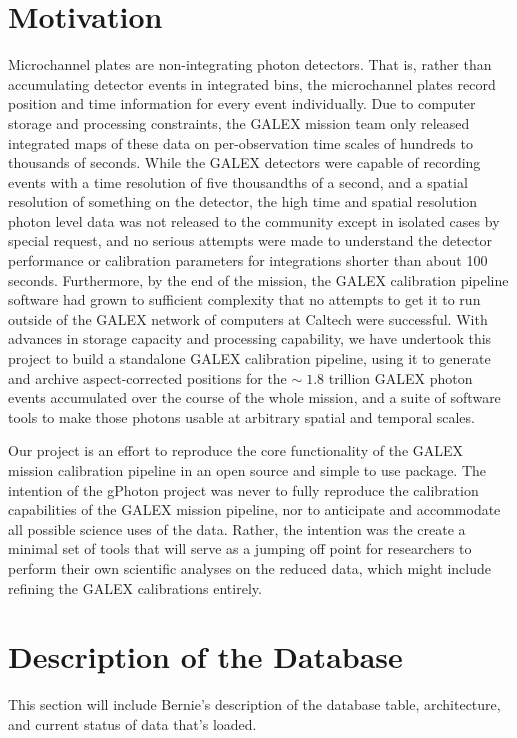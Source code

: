 \documentclass[preprint]{aastex}
\begin{document}
\section{Motivation}
\label{motivation}
Microchannel plates are non-integrating photon detectors. That is, rather than accumulating detector events in integrated bins, the microchannel plates record position and time information for every event individually. Due to computer storage and processing constraints, the GALEX mission team only released integrated maps of these data on per-observation time scales of hundreds to thousands of seconds. While the GALEX detectors were capable of recording events with a time resolution of five thousandths of a second, and a spatial resolution of {\color{red}something} on the detector, the high time and spatial resolution photon level data was not released to the community except in isolated cases by special request, and no serious attempts were made to understand the detector performance or calibration parameters for integrations shorter than about 100 seconds. Furthermore, by the end of the mission, the GALEX calibration pipeline software had grown to sufficient complexity that no attempts to get it to run outside of the GALEX network of computers at Caltech were successful. With advances in storage capacity and processing capability, we have undertook this project to build a standalone GALEX calibration pipeline, using it to generate and archive aspect-corrected positions for the $\sim\;1.8$ trillion GALEX photon events accumulated over the course of the whole mission, and a suite of software tools to make those photons usable at arbitrary spatial and temporal scales.

Our project is an effort to reproduce the core functionality of the GALEX mission calibration pipeline in an open source and simple to use package. The intention of the gPhoton project was never to fully reproduce the calibration capabilities of the GALEX mission pipeline, nor to anticipate and accommodate all possible science uses of the data. Rather, the intention was the create a minimal set of tools that will serve as a jumping off point for researchers to perform their own scientific analyses on the reduced data, which might include refining the GALEX calibrations entirely.

\section{Description of the Database}
\label{database}
This section will include Bernie's description of the database table, architecture, and current status of data that's loaded.
\end{document}
